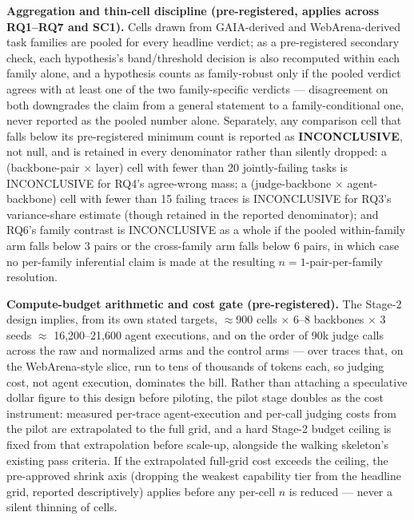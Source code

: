 \documentclass[11pt]{article}
\begin{document}
\textbf{Aggregation and thin-cell discipline (pre-registered, applies across RQ1--RQ7 and SC1).} Cells drawn from GAIA-derived and WebArena-derived task families are pooled for every headline verdict; as a pre-registered secondary check, each hypothesis's band/threshold decision is also recomputed within each family alone, and a hypothesis counts as family-robust only if the pooled verdict agrees with at least one of the two family-specific verdicts --- disagreement on both downgrades the claim from a general statement to a family-conditional one, never reported as the pooled number alone. Separately, any comparison cell that falls below its pre-registered minimum count is reported as \textbf{INCONCLUSIVE}, not null, and is retained in every denominator rather than silently dropped: a (backbone-pair $\times$ layer) cell with fewer than 20 jointly-failing tasks is INCONCLUSIVE for RQ4's agree-wrong mass; a (judge-backbone $\times$ agent-backbone) cell with fewer than 15 failing traces is INCONCLUSIVE for RQ3's variance-share estimate (though retained in the reported denominator); and RQ6's family contrast is INCONCLUSIVE as a whole if the pooled within-family arm falls below 3 pairs or the cross-family arm falls below 6 pairs, in which case no per-family inferential claim is made at the resulting $n=1$-pair-per-family resolution.

\textbf{Compute-budget arithmetic and cost gate (pre-registered).} The Stage-2 design implies, from its own stated targets, $\approx$900 cells $\times$ 6--8 backbones $\times$ 3 seeds $\approx$ 16,200--21,600 agent executions, and on the order of 90k judge calls across the raw and normalized arms and the control arms --- over traces that, on the WebArena-style slice, run to tens of thousands of tokens each, so judging cost, not agent execution, dominates the bill. Rather than attaching a speculative dollar figure to this design before piloting, the pilot stage doubles as the cost instrument: measured per-trace agent-execution and per-call judging costs from the pilot are extrapolated to the full grid, and a hard Stage-2 budget ceiling is fixed from that extrapolation before scale-up, alongside the walking skeleton's existing pass criteria. If the extrapolated full-grid cost exceeds the ceiling, the pre-approved shrink axis (dropping the weakest capability tier from the headline grid, reported descriptively) applies before any per-cell $n$ is reduced --- never a silent thinning of cells.
\end{document}
